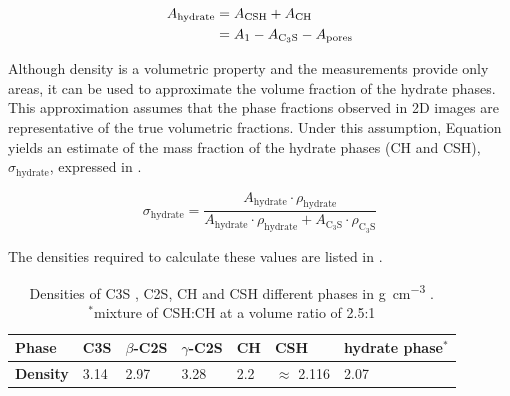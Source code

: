 \begin{equation}
    \label{eq:est_hydrate_area}
    \begin{aligned}
        A_\text{hydrate} &= A_\text{\text{CSH}} + A_\text{CH} \\
        &= A_1 - A_{\text{C}_3\text{S}} - A_{\text{pores}}
    \end{aligned}
\end{equation}

Although density is a volumetric property and the measurements provide only areas, it can be used to approximate the volume fraction of the hydrate phases.
This approximation assumes that the phase fractions observed in 2D images are representative of the true volumetric fractions.
Under this assumption, Equation  yields an estimate of the mass fraction of the hydrate phases (\ac{CH} and \ac{CSH}), \(\sigma_{\text{hydrate}}\), expressed in \unit{\wtpercent}.

\begin{equation}
    \label{eq:est_frac}
    \sigma_\text{hydrate} = \frac{A_\text{hydrate} \cdot \rho_\text{hydrate}}{A_\text{hydrate} \cdot \rho_\text{hydrate} + A_{\text{C}_3\text{S}} \cdot \rho_{\text{C}_3\text{S}}}
\end{equation}

The densities required to calculate these values are listed in .

\begin{table}[htb]
    \centering
    \caption{
        Densities of \ac{C3S} \cite{garrault.2006}, \ac{C2S}\cite{zhang.2012a}, \ac{CH} and \ac{CSH} \cite{garrault.2006} different phases in \unit{\gram\per\cubic\centi\meter} \cite{jennings.2000,garrault.2006}.\\$^{*}$mixture of \ac{CSH}:\ac{CH} at a volume ratio of \num{2.5}:\num{1}}
    \label{tab:densities}
    \begin{tabularx}{\textwidth}{@{}XXXXXXX@{}}
        \toprule
        \textbf{Phase} & \ac{C3S} & $\beta$-\ac{C2S} & $\gamma$-\ac{C2S} & \ac{CH} & \ac{CSH} & hydrate phase$^{*}$\\
		\midrule
        \textbf{Density} & \num{3.14} & \num{2.97} & \num{3.28} & \num{2.2} & $\approx$ \num{2.116} &  \num{2.07} \\
		\bottomrule
    \end{tabularx}
\end{table}

\FloatBarrier
